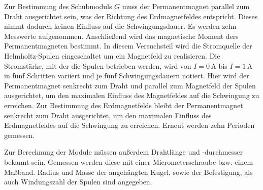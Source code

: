 Zur Bestimmung des Schubmoduls $G$ muss der Permanentmagnet parallel zum Draht ausgerichtet sein, was der Richtung des Erdmagnetfeldes entspricht. Dieses nimmt dadurch keinen Einfluss auf die Schwingungsdauer. Es werden zehn Messwerte aufgenommen.
Anschließend wird das magnetische Moment ders Permanentmagneten bestimmt. In diesem Versuchsteil wird die Stromquelle der Helmholtz-Spulen eingeschaltet um ein Magnetfeld zu realisieren. Die Stromstärke, mit der die Spulen betrieben werden, wird von $I=0\,\si\ampere$ bis $I=1\,\si\ampere$ in fünf Schritten variiert und je fünf Schwingungsdauern notiert.
 Hier wird der Permanentmagnet senkrecht zum Draht und parallel zum Magnetfeld der Spulen ausgerichtet, um den maximalen Einfluss des Magnetfeldes  auf die Schwingung zu erreichen.  
Zur Bestimmung des Erdmagnetfelds bleibt der Permanentmagnet senkrecht zum Draht ausgerichtet, um den maximalen Einfluss des Erdmagnetfeldes auf die Schwingung zu erreichen. Erneut werden zehn Perioden gemessen.

Zur Berechnung der Module müssen außerdem Drahtlänge und -durchmesser bekannt sein. Gemessen werden diese mit einer Micrometerschraube bzw. einem Maßband.
Radius und Masse der angehängten Kugel, sowie der Befestigung, als auch Windungszahl der Spulen sind angegeben.

